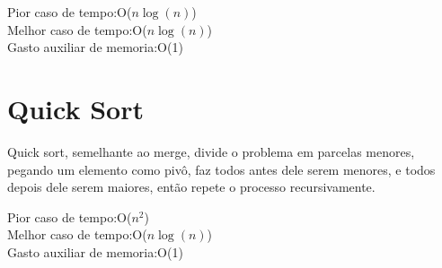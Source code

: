 \noindent Pior caso de tempo:O($n\log(n)$)\\
Melhor caso de tempo:O($n\log(n)$)\\
Gasto auxiliar de memoria:O(1)

\section{Quick Sort}
\label{sec:quick_sort}
Quick sort, semelhante ao merge, divide o problema em parcelas menores, pegando um elemento como pivô, faz todos antes dele serem menores, e todos depois dele serem maiores, então repete o processo recursivamente.

\noindent Pior caso de tempo:O($n^2$)\\
Melhor caso de tempo:O($n\log(n)$)\\
Gasto auxiliar de memoria:O(1)